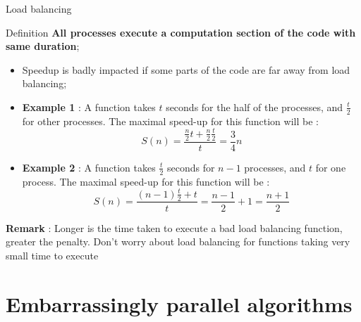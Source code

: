 \documentclass[compress,10pt,aspectratio=169]{beamer}
\begin{document}
\begin{frame}[fragile]{Load balancing}
    \scriptsize
    \begin{block}{Definition}
      \textbf{All processes execute a computation section of the code with same duration};
    \end{block}

    \begin{itemize}
        \item Speedup is badly impacted if some parts of the code are far away from load balancing;
        \item \textbf{Example 1} : A function takes $t$ seconds for the half of the processes, and $\frac{t}{2}$
              for other processes. The maximal speed-up for this function will be :
            \[
                S(n) = \frac{\frac{n}{2}t + \frac{n}{2}\frac{t}{2}}{t} = \frac{3}{4}n
            \]
        \item \textbf{Example 2} : A function takes $\frac{t}{2}$ seconds for $n-1$ processes, and $t$
            for one process. The maximal speed-up for this function will be :
          \[
              S(n) = \frac{(n-1)\frac{t}{2} + t}{t} = \frac{n-1}{2} + 1 = \frac{n+1}{2}
          \]
  \end{itemize}

  \textbf{Remark} : Longer is the time taken to execute a bad load balancing function, greater the penalty. Don't worry
  about load balancing for functions taking very small time to execute
\end{frame}

\section{Embarrassingly parallel algorithms}
\end{document}
